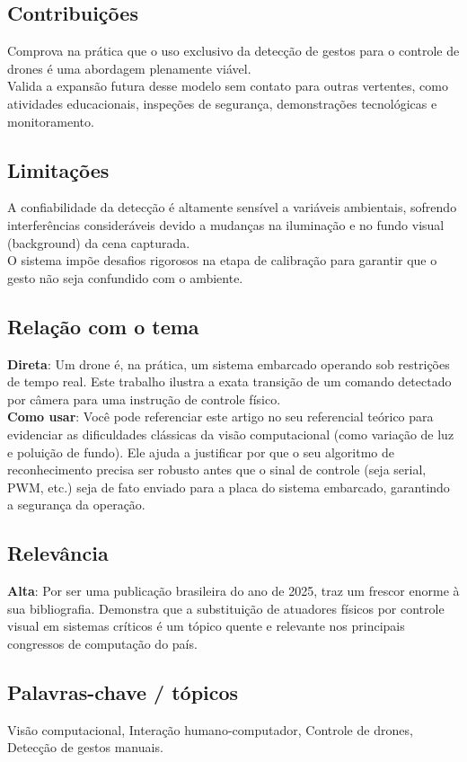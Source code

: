 \documentclass[12pt, a4paper]{article}
\begin{document}
\subsection{Contribuições}
Comprova na prática que o uso exclusivo da detecção de gestos para o controle de drones é uma abordagem plenamente viável.\\
Valida a expansão futura desse modelo sem contato para outras vertentes, como atividades educacionais, inspeções de segurança, demonstrações tecnológicas e monitoramento.\\
\subsection{Limitações}
A confiabilidade da detecção é altamente sensível a variáveis ambientais, sofrendo interferências consideráveis devido a mudanças na iluminação e no fundo visual (background) da cena capturada.\\
O sistema impõe desafios rigorosos na etapa de calibração para garantir que o gesto não seja confundido com o ambiente.\\
\subsection{Relação com o tema}
\textbf{Direta}: Um drone é, na prática, um sistema embarcado operando sob restrições de tempo real. Este trabalho ilustra a exata transição de um comando detectado por câmera para uma instrução de controle físico.\\
\textbf{Como usar}: Você pode referenciar este artigo no seu referencial teórico para evidenciar as dificuldades clássicas da visão computacional (como variação de luz e poluição de fundo). Ele ajuda a justificar por que o seu algoritmo de reconhecimento precisa ser robusto antes que o sinal de controle (seja serial, PWM, etc.) seja de fato enviado para a placa do sistema embarcado, garantindo a segurança da operação.\\
\subsection{Relevância}
\textbf{Alta}: Por ser uma publicação brasileira do ano de 2025, traz um frescor enorme à sua bibliografia. Demonstra que a substituição de atuadores físicos por controle visual em sistemas críticos é um tópico quente e relevante nos principais congressos de computação do país.\\
\subsection{Palavras-chave / tópicos}
Visão computacional, Interação humano-computador, Controle de drones, Detecção de gestos manuais.\\
\end{document}
